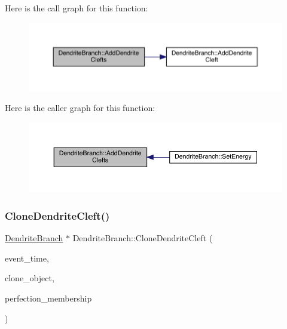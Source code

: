 Here is the call graph for this function\+:\nopagebreak
\begin{figure}[H]
\begin{center}
\leavevmode
\includegraphics[width=350pt]{class_dendrite_branch_a2ddeff41db805e414c994ac169cbcf4b_cgraph}
\end{center}
\end{figure}
Here is the caller graph for this function\+:\nopagebreak
\begin{figure}[H]
\begin{center}
\leavevmode
\includegraphics[width=350pt]{class_dendrite_branch_a2ddeff41db805e414c994ac169cbcf4b_icgraph}
\end{center}
\end{figure}
\mbox{\label{class_dendrite_branch_a45d2fea350165fe0c81f1f429aa96061}} 
\subsubsection{\texorpdfstring{Clone\+Dendrite\+Cleft()}{CloneDendriteCleft()}}
{\footnotesize\ttfamily \hyperlink{class_dendrite_branch}{Dendrite\+Branch} $\ast$ Dendrite\+Branch\+::\+Clone\+Dendrite\+Cleft (\begin{DoxyParamCaption}\item[{std\+::chrono\+::time\+\_\+point$<$ \hyperlink{universe_8h_a0ef8d951d1ca5ab3cfaf7ab4c7a6fd80}{Clock} $>$}]{event\+\_\+time,  }\item[{\hyperlink{class_dendrite_branch}{Dendrite\+Branch} $\ast$}]{clone\+\_\+object,  }\item[{double}]{perfection\+\_\+membership }\end{DoxyParamCaption})}




